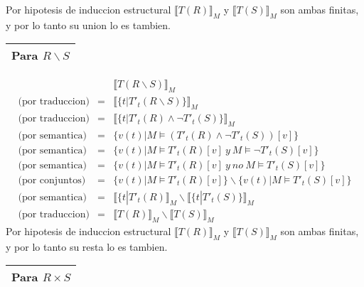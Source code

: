 \documentclass[a4paper]{article}
\begin{document}
		Por hipotesis de induccion estructural $\llbracket T(R)\rrbracket _M$ y $\llbracket T(S)\rrbracket _M$ son ambas finitas, y por lo tanto su union lo es tambien.
%
	\begin{center}
	\begin{tabular}{p{12cm}}
	\hline
	\textbf{Para $R \backslash S$} \\
	\hline
	\end{tabular}
	\end{center}
%	
		\begin{eqnarray*}
			&& \llbracket T(R \backslash S)\rrbracket _M \\
			\mbox{(por traduccion)} & = & \llbracket \{t|T'_t(R \backslash S)\}\rrbracket _M \\
			\mbox{(por traduccion)} & = & \llbracket \{t|T'_t(R)\wedge \neg T'_t(S)\}\rrbracket _M \\
			\mbox{(por semantica)} & = & \{v(t)|M \models (T'_t(R)\wedge \neg T'_t(S))[v]\} \\
			\mbox{(por semantica)} & = & \{v(t)|M \models T'_t(R)[v] \ y \ M \models \neg T'_t(S)[v]\} \\
			\mbox{(por semantica)} & = & \{v(t)|M \models T'_t(R)[v] \ y \ no \ M \models T'_t(S)[v]\} \\
			\mbox{(por conjuntos)} & = & \{v(t)|M \models T'_t(R)[v]\} \backslash \{v(t)|M \models T'_t(S)[v]\} \\
			\mbox{(por semantica)} & = & \llbracket \{t|T'_t(R)\rrbracket _M \backslash \llbracket \{t|T'_t(S)\}\rrbracket _M \\
			\mbox{(por traduccion)} & = & \llbracket T(R)\rrbracket _M \backslash \llbracket T(S)\rrbracket _M
		\end{eqnarray*}
		Por hipotesis de induccion estructural $\llbracket T(R)\rrbracket _M$ y $\llbracket T(S)\rrbracket _M$ son ambas finitas, y por lo tanto su resta lo es tambien.
%
	\begin{center}
	\begin{tabular}{p{12cm}}
	\hline
	\textbf{Para $R \times S$} \\
	\hline
	\end{tabular}
	\end{center}
%	
\end{document}
